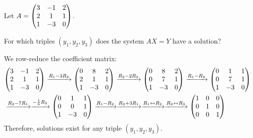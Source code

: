 \begin{xca}
  Let $A = \mqty(3&-1&2 \\ 2&1&1 \\ 1&-3&0)$.

  For which triples $(y_1, y_2, y_3)$ does the system $AX = Y$ have a solution?
\end{xca}
\begin{prf}
  We row-reduce the coefficient matrix:
  \begin{equation*}
    \begin{split}
      & \mqty(3&-1&2 \\ 2&1&1 \\ 1&-3&0)
      \xto{R_1 - 3R_3} \mqty(0&8&2 \\ 2&1&1 \\ 1&-3&0)
      \xto{R_2 - 2R_3} \mqty(0&8&2 \\ 0&7&1 \\ 1&-3&0)
      \xto{R_1 - R_2} \mqty(0&1&1 \\ 0&7&1 \\ 1&-3&0) \\
      & \xto{R_2 - 7R_1} \xto{-\frac16 R_2} \mqty(0&1&1 \\ 0&0&1 \\ 1&-3&0)
      \xto{R_1 - R_2} \xto{R_3 + 3R_1} \xto{R_1 \harr R_2} \xto{R_2 \harr R_3}
      \mqty(\imat{3})
    \end{split}
  \end{equation*}
  Therefore, solutions exist for any triple $(y_1, y_2, y_3)$.
\end{prf}

